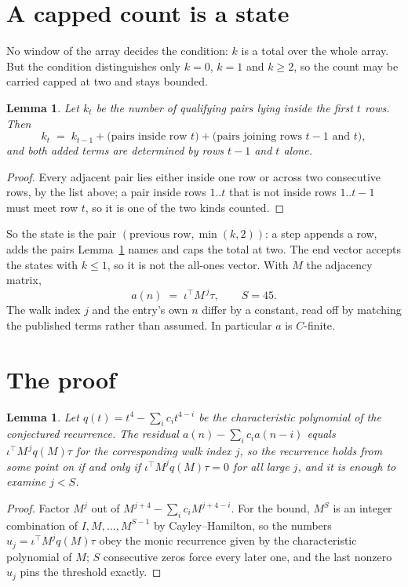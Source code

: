 \documentclass[11pt,a4paper]{article}
\theoremstyle{plain}
\newtheorem{lemma}[theorem]{Lemma}
\theoremstyle{definition}
\begin{document}
\section{A capped count is a state}

No window of the array decides the condition: $k$ is a total over the whole array. But the
condition distinguishes only $k=0$, $k=1$ and $k\ge2$, so the count may be carried capped at
two and stays bounded.

\begin{lemma}\label{lem:cap}
Let $k_t$ be the number of qualifying pairs lying inside the first $t$ rows. Then
\[
k_{t}\;=\;k_{t-1}+\bigl(\text{pairs inside row } t\bigr)
+\bigl(\text{pairs joining rows } t-1 \text{ and } t\bigr),
\]
and both added terms are determined by rows $t-1$ and $t$ alone.
\end{lemma}

\begin{proof}
Every adjacent pair lies either inside one row or across two consecutive rows, by the list
above; a pair inside rows $1..t$ that is not inside rows $1..t-1$ must meet row $t$, so it is
one of the two kinds counted.
\end{proof}

So the state is the pair $(\text{previous row},\min(k,2))$: a step appends a row, adds the
pairs Lemma~\ref{lem:cap} names and caps the total at two. The end vector accepts the states
with $k\le1$, so it is not the all-ones vector. With $M$ the adjacency matrix,
\[
a(n)\;=\;\iota^{\!\top}M^{\,j}\tau ,\qquad S=45.
\]
The walk index $j$ and the entry's own $n$ differ by a constant, read off by matching the
published terms rather than assumed. In particular $a$ is $C$-finite.

\section{The proof}

\begin{lemma}\label{lem:crit}
Let $q(t)=t^{4}-\sum_i c_it^{4-i}$ be the characteristic polynomial of the
conjectured recurrence. The residual $a(n)-\sum_ic_ia(n-i)$ equals
$\iota^{\!\top}M^{\,j}q(M)\tau$ for the corresponding walk index $j$, so the recurrence
holds from some point on if and only if $\iota^{\!\top}M^{j}q(M)\tau=0$ for all large $j$,
and it is enough to examine $j<S$.
\end{lemma}

\begin{proof}
Factor $M^{j}$ out of $M^{j+4}-\sum_ic_iM^{j+4-i}$. For the bound, $M^{S}$
is an integer combination of $I,M,\dots,M^{S-1}$ by Cayley--Hamilton, so the numbers
$u_j=\iota^{\!\top}M^{j}q(M)\tau$ obey the monic recurrence given by the characteristic
polynomial of $M$; $S$ consecutive zeros force every later one, and the last nonzero $u_j$
pins the threshold exactly.
\end{proof}
\end{document}
